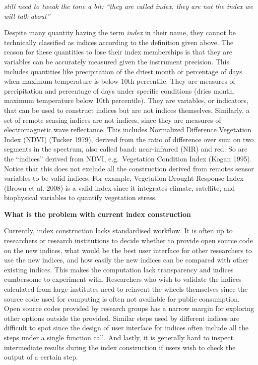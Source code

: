 \documentclass[
]{article}
\begin{document}
\emph{still need to tweak the tone a bit: ``they are called index, they
are not the index we will talk about''}

Despite many quantity having the term \emph{index} in their name, they
cannot be technically classified as indices according to the definition
given above. The reason for these quantities to lose their index
memberships is that they are variables can be accurately measured given
the instrument precision. This includes quantities like precipitation of
the driest month or percentage of days when maximum temperature is below
10th percentile. They are measures of precipitation and percentage of
days under specific conditions (dries month, maximum temperature below
10th percentile). They are variables, or indicators, that can be used to
construct indices but are not indices themselves. Similarly, a set of
remote sensing indices are not indices, since they are measures of
electromagnetic wave reflectance. This includes Normalized Difference
Vegetation Index (NDVI) (Tucker 1979), derived from the ratio of
difference over sum on two segments in the spectrum, also called band:
near-infrared (NIR) and red. So are the ``indices'' derived from NDVI,
e.g.~Vegetation Condition Index (Kogan 1995). Notice that this does not
exclude all the construction derived from remotes sensor variables to be
valid indices. For example, Vegetation Drought Response Index (Brown et
al. 2008) is a valid index since it integrates climate, satellite, and
biophysical variables to quantify vegetation stress.

\newpage

\textbf{What is the problem with current index construction}

Currently, index construction lacks standardised workflow. It is often
up to researchers or research institutions to decide whether to provide
open source code on the new indices, what would be the best user
interface for other researchers to use the new indices, and how easily
the new indices can be compared with other existing indices. This makes
the computation lack transparency and indices cumbersome to experiment
with. Researchers who wish to validate the indices calculated from large
institutes need to reinvent the wheels themselves since the source code
used for computing is often not available for public consumption. Open
source codes provided by research groups has a narrow margin for
exploring other options outside the provided. Similar steps used by
different indices are difficult to spot since the design of user
interface for indices often include all the steps under a single
function call. And lastly, it is generally hard to inspect intermediate
results during the index construction if users wish to check the output
of a certain step.
\end{document}
